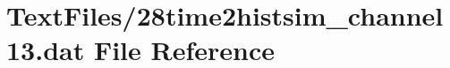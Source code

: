 \hypertarget{28time2histsim__channel13_8dat}{}\section{Text\+Files/28time2histsim\+\_\+channel13.dat File Reference}
\label{28time2histsim__channel13_8dat}
